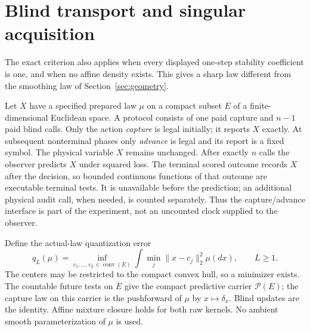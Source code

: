 \section{Blind transport and singular acquisition}\label{sec:singular}
The exact criterion also applies when every displayed one-step stability coefficient is one, and when no affine density exists. This gives a sharp law different from the smoothing law of Section~\ref{sec:geometry}.

Let $X$ have a specified prepared law $\mu$ on a compact subset $E$ of a finite-dimensional Euclidean space. A protocol consists of one paid capture and $n-1$ paid blind calls. Only the action \emph{capture} is legal initially; it reports $X$ exactly. At subsequent nonterminal phases only \emph{advance} is legal and its report is a fixed symbol. The physical variable $X$ remains unchanged. After exactly $n$ calls the observer predicts $X$ under squared loss. The terminal scored outcome records $X$ after the decision, so bounded continuous functions of that outcome are executable terminal tests. It is unavailable before the prediction; an additional physical audit call, when needed, is counted separately. Thus the capture/advance interface is part of the experiment, not an uncounted clock supplied to the observer.

Define the actual-law quantization error
\[
 q_L(\mu)=\inf_{c_1,\ldots,c_L\in\operatorname{conv}(E)}
               \int\min_j\|x-c_j\|_2^2\mu(dx),\qquad L\ge1.
\]
The centers may be restricted to the compact convex hull, so a minimizer exists. The countable future tests on $E$ give the compact predictive carrier $\mathcal P(E)$; the capture law on this carrier is the pushforward of $\mu$ by $x\mapsto\delta_x$. Blind updates are the identity. Affine mixture closure holds for both raw kernels. No ambient smooth parameterization of $\mu$ is used.

